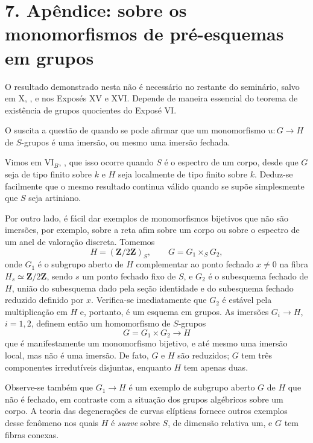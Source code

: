 
\section*{7. Apêndice: sobre os monomorfismos de pré-esquemas em grupos}

O resultado demonstrado nesta 
não é necessário no restante do seminário, salvo em X,
, e nos Exposés XV e XVI. Depende de
maneira essencial do teorema de existência de grupos quocientes do Exposé
VI.

O  suscita a questão
de quando se pode afirmar que um monomorfismo \(u:G\to H\) de
\(S\)-grupos é uma imersão, ou mesmo uma imersão fechada.

Vimos em VI\(_B\), , que isso ocorre
quando \(S\) é o espectro de um corpo, desde que \(G\) seja de
tipo finito sobre \(k\) e \(H\) seja localmente de tipo finito sobre \(k\).
Deduz-se facilmente que o mesmo resultado continua válido quando se
supõe simplesmente que \(S\) seja artiniano.

Por outro lado, é fácil dar exemplos de monomorfismos bijetivos que não são
imersões, por exemplo, sobre a reta afim sobre um corpo ou sobre o
espectro de um anel de valoração discreta. Tomemos
\[
  H=(\mathbf Z/2\mathbf Z)_S,\qquad G=G_1\times_SG_2,
\]
onde \(G_1\) é o subgrupo aberto de \(H\) complementar ao ponto
fechado \(x\ne0\) na fibra \(H_s\simeq\mathbf Z/2\mathbf Z\), sendo
\(s\) um ponto fechado fixo de \(S\), e \(G_2\) é o subesquema fechado
de \(H\), união do subesquema dado pela seção identidade e do
subesquema fechado reduzido definido por \(x\). Verifica-se imediatamente
que \(G_2\) é estável pela multiplicação em \(H\) e, portanto, é um
esquema em grupos. As imersões \(G_i\to H\), \(i=1,2\), definem
então um homomorfismo de \(S\)-grupos
\[
  G=G_1\times G_2\longrightarrow H
\]
que é manifestamente um monomorfismo bijetivo, e até mesmo uma imersão
local, mas não é uma imersão. De fato, \(G\) e \(H\) são reduzidos;
\(G\) tem três componentes irredutíveis disjuntas, enquanto \(H\)
tem apenas duas.

Observe-se também que \(G_1\to H\) é um exemplo de subgrupo aberto \(G\) de
\(H\) que não é fechado, em contraste com a situação dos grupos
algébricos sobre um corpo. A teoria das degenerações de curvas
elípticas fornece outros exemplos desse fenômeno nos quais \(H\) é \emph{suave} sobre
\(S\), de dimensão relativa um, e \(G\) tem fibras conexas.

